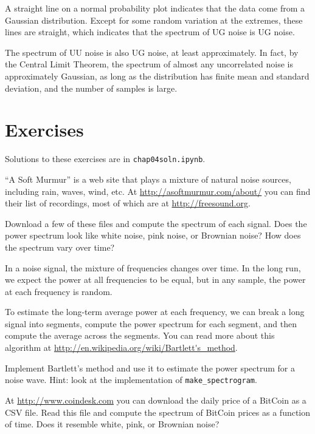 \documentclass[12pt]{book}
\begin{document}
A straight line on a normal probability plot indicates
that the data come from a Gaussian distribution.  Except for
some random variation at the extremes, these lines are straight,
which indicates that the spectrum of UG noise is UG noise.

The spectrum of UU noise is also UG noise, at least approximately.  In
fact, by the Central Limit Theorem, the spectrum of almost any
uncorrelated noise is approximately Gaussian, as long as the
distribution has finite mean and standard deviation, and the number of
samples is large.


\section{Exercises}

Solutions to these exercises are in {\tt chap04soln.ipynb}.

\begin{exercise}
``A Soft Murmur'' is a web site that plays a mixture of natural
noise sources, including rain, waves, wind, etc.  At
\url{http://asoftmurmur.com/about/} you can find their list
of recordings, most of which are at \url{http://freesound.org}.

Download a few of these files and compute the spectrum of each
signal.  Does the power spectrum look like white noise, pink noise,
or Brownian noise?  How does the spectrum vary over time?
\end{exercise}


\begin{exercise}
In a noise signal, the mixture of frequencies changes over time.
In the long run, we expect the power at all frequencies to be equal,
but in any sample, the power at each frequency is random.

To estimate the long-term average power at each frequency, we can
break a long signal into segments, compute the power spectrum
for each segment, and then compute the average across
the segments.  You can read more about this algorithm at
\url{http://en.wikipedia.org/wiki/Bartlett's_method}.

Implement Bartlett's method and use it to estimate the power
spectrum for a noise wave.  Hint: look at the implementation
of \verb"make_spectrogram".
\end{exercise}


\begin{exercise}
At \url{http://www.coindesk.com} you can download the daily
price of a BitCoin as a CSV file.  Read this file and compute
the spectrum of BitCoin prices as a function of time.
Does it resemble white, pink, or Brownian noise?
\end{exercise}
\end{document}
